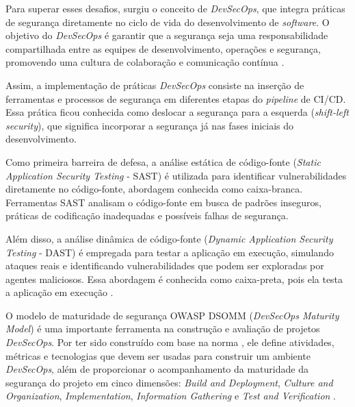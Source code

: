 Para superar esses desafios, surgiu o conceito de \textit{DevSecOps}, que integra práticas de segurança diretamente no ciclo de vida do desenvolvimento de \textit{software}. O objetivo do \textit{DevSecOps} é garantir que a segurança seja uma responsabilidade compartilhada entre as equipes de desenvolvimento, operações e segurança, promovendo uma cultura de colaboração e comunicação contínua \cite{Sinan2025}.



Assim, a implementação de práticas \textit{DevSecOps} consiste na inserção de ferramentas e processos de segurança em diferentes etapas do \textit{pipeline} de CI/CD. Essa prática ficou conhecida como deslocar a segurança para a esquerda (\textit{shift-left security}), que significa incorporar a segurança já nas fases iniciais do desenvolvimento.

Como primeira barreira de defesa, a análise estática de código-fonte (\textit{Static Application Security Testing} - SAST) é utilizada para identificar vulnerabilidades diretamente no código-fonte, abordagem conhecida como caixa-branca. Ferramentas SAST analisam o código-fonte em busca de padrões inseguros, práticas de codificação inadequadas e possíveis falhas de segurança.

Além disso, a análise dinâmica de código-fonte (\textit{Dynamic Application Security Testing} - DAST) é empregada para testar a aplicação em execução, simulando ataques reais e identificando vulnerabilidades que podem ser exploradas por agentes maliciosos. Essa abordagem é conhecida como caixa-preta, pois ela testa a aplicação em execução \cite{Sinan2025}.

O modelo de maturidade de segurança OWASP DSOMM (\textit{DevSecOps Maturity Model}) é uma importante ferramenta na construção e avaliação de projetos \textit{DevSecOps}. Por ter sido construído com base na norma , ele define atividades, métricas e tecnologias que devem ser usadas para construir um ambiente \textit{DevSecOps}, além de proporcionar o acompanhamento da maturidade da segurança do projeto em cinco dimensões: \textit{Build and Deployment}, \textit{Culture and Organization}, \textit{Implementation}, \textit{Information Gathering} e \textit{Test and Verification} \cite{Lange2024}.